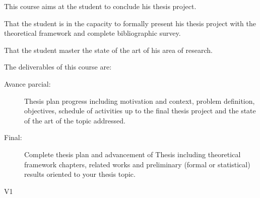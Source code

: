 \begin{syllabus}


\begin{justification}
This course aims at the student to conclude his thesis project.
\end{justification}

\begin{goals}
\item That the student is in the capacity to formally present his thesis project with the theoretical framework and complete bibliographic survey.
\item That the student master the state of the art of his area of research.
\item The deliverables of this course are:
	\begin{description}
	\item [Avance parcial:] Thesis plan progress including motivation and context, problem definition, objectives, schedule of activities up to the final thesis project and the state of the art of the topic addressed.
	\item [Final:] Complete thesis plan and advancement of Thesis including theoretical framework chapters, related works and preliminary (formal or statistical) results oriented to your thesis topic.
	\end{description}
\end{goals}

\begin{outcomes}{V1}
    \item {}
    \item {}
    \item {}
    \item {}
    \item {}
    \item {}
    \item {}
    \item {}
    \item {}
    \item {}
    \item {}
\end{outcomes}


\end{syllabus}
